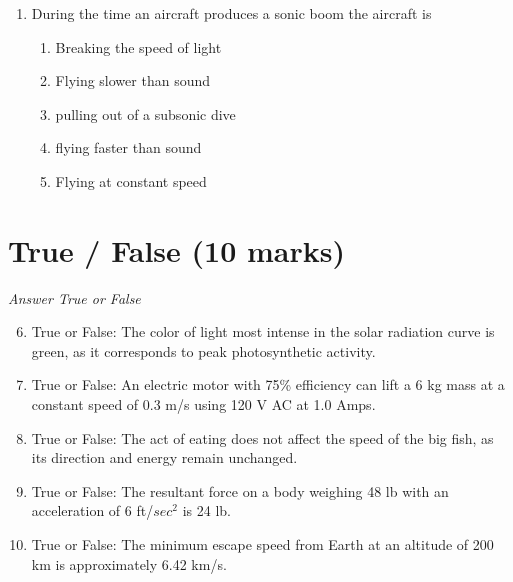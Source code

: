 \documentclass[12pt]{article}
\begin{document}
\begin{enumerate}[label=\arabic*.]
\begin{enumerate}[label=(\alph*)]
    \item Both of the above
    \item +3 e and -4 e
    \item +5 e and -6 e
    \item +2.5 e and -3.5 e
    \item +4 e and -5 e
\end{enumerate}
\item During the time an aircraft produces a sonic boom the aircraft is
\begin{enumerate}[label=(\alph*)]
    \item Breaking the speed of light
    \item Flying slower than sound
    \item pulling out of a subsonic dive
    \item flying faster than sound
    \item Flying at constant speed
\end{enumerate}
\end{enumerate}

\section*{True / False (10 marks)}
\textit{Answer True or False}
\begin{enumerate}[label=\arabic*.]
\setcounter{enumi}{5}
\item True or False: The color of light most intense in the solar radiation curve is green, as it corresponds to peak photosynthetic activity.
\item True or False: An electric motor with 75\% efficiency can lift a 6 kg mass at a constant speed of 0.3 m/s using 120 V AC at 1.0 Amps.
\item True or False: The act of eating does not affect the speed of the big fish, as its direction and energy remain unchanged.
\item True or False: The resultant force on a body weighing 48 lb with an acceleration of 6 ft/$sec^2$ is 24 lb.
\item True or False: The minimum escape speed from Earth at an altitude of 200 km is approximately 6.42 km/s.
\end{enumerate}
\end{document}
